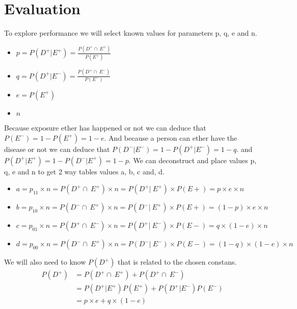 \chapter{Evaluation} \label{sec:Evaluation}

To explore performance we will select known values for parameters p, q, e and n. 
\begin{itemize}
    \item $p = P(D^+ |E^+) = \frac{P(D^+ \cap\ E^+)}{P(E^+)}$ 
    \item $q = P(D^+ |E^-) = \frac{P(D^+ \cap\ E^-)}{P(E^-)}$
    \item $e = P(E^+)$
    \item $n$
\end{itemize}

Because exposure ether has happened or not we can deduce that $P(E^-) = 1 - P(E^+) = 1 - e.$ And because a person can ether have the disease or not we can deduce that $P(D^- |E^-) = 1 - P(D^+ |E^-) = 1 - q.$ and $P(D^+ |E^+) = 1 - P(D^- |E^+) = 1 - p$. We can deconstruct and place values p, q, e and n to get 2 way tables values a, b, c and, d.
 
\begin{itemize}
    \item $a = p_{11} \times n = P(D^+ \cap\ E^+) \times n = P(D^+ |\ E^+) \times P(E+) = p \times e \times n$
    \item $b = p_{10} \times n = P(D^- \cap\ E^+) \times n = P(D^- |\ E^+) \times P(E+) = (1 - p) \times e \times n$
    \item $c = p_{01} \times n = P(D^+ \cap\ E^-) \times n = P(D^+ |\ E^-) \times P(E-) = q \times (1 - e) \times n$
    \item $d = p_{00} \times n = P(D^- \cap\ E^+) \times n = P(D^- |\ E^-) \times P(E-) = (1 - q) \times (1 - e) \times n$
\end{itemize}

We will also need to know $P(D^+)$ that is related to the chosen constans.
\begin{equation}
    \begin{split}
    P(D^+) &= P(D^+ \cap\ E^+) + P(D^+ \cap\ E^-) \\
           &= P(D^+ | E^+)P(E^+) + P(D^+ | E^-)P(E^-)  \\
           &= p \times e + q \times (1 - e) \\
    \end{split}
\end{equation}

